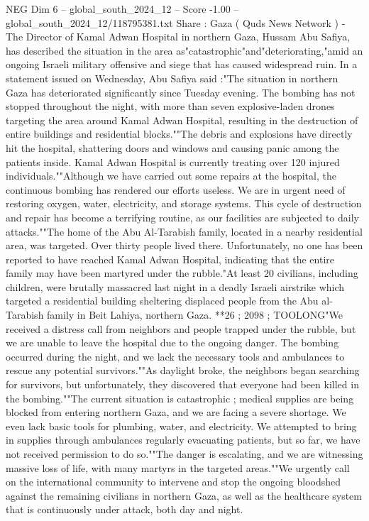 \begin{textsample}{NEG Dim 6 – global\_south\_2024\_12 – Score -1.00 – global\_south\_2024\_12/118795381.txt}  \label{ex:f6_neg_024}
Share : Gaza ( Quds News Network ) - The Director of Kamal Adwan Hospital in northern Gaza, Hussam Abu Safiya, has described the situation in the area as"catastrophic"and"deteriorating,"amid an ongoing Israeli military offensive and siege that has caused widespread ruin.
In a statement issued on Wednesday, Abu Safiya said :"The situation in northern Gaza has deteriorated significantly since Tuesday evening.
The bombing has not stopped throughout the night, with more than seven explosive-laden drones targeting the area around Kamal Adwan Hospital, resulting in the destruction of entire buildings and residential blocks.""The debris and explosions have directly hit the hospital, shattering doors and windows and causing panic among the patients inside.
Kamal Adwan Hospital is currently treating over 120 injured individuals.""Although we have carried out some repairs at the hospital, the continuous bombing has rendered our efforts useless.
We are in urgent need of restoring oxygen, water, electricity, and storage systems.
This cycle of destruction and repair has become a terrifying routine, as our facilities are subjected to daily attacks.""The home of the Abu Al-Tarabish family, located in a nearby residential area, was targeted.
Over thirty people lived there.
Unfortunately, no one has been reported to have reached Kamal Adwan Hospital, indicating that the entire family may have been martyred under the rubble."At least 20 civilians, including children, were brutally massacred last night in a deadly Israeli airstrike which targeted a residential building sheltering displaced people from the Abu al-Tarabish family in Beit Lahiya, northern Gaza. **26 ; 2098 ; TOOLONG"We received a distress call from neighbors and people trapped under the rubble, but we are unable to leave the hospital due to the ongoing danger.
The bombing occurred during the night, and we lack the necessary tools and ambulances to rescue any potential survivors.""As daylight broke, the neighbors began searching for survivors, but unfortunately, they discovered that everyone had been killed in the bombing.""The current situation is catastrophic ; medical supplies are being blocked from entering northern Gaza, and we are facing a severe shortage.
We even lack basic tools for plumbing, water, and electricity.
We attempted to bring in supplies through ambulances regularly evacuating patients, but so far, we have not received permission to do so.""The danger is escalating, and we are witnessing massive loss of life, with many martyrs in the targeted areas.""We urgently call on the international community to intervene and stop the ongoing bloodshed against the remaining civilians in northern Gaza, as well as the healthcare system that is continuously under attack, both day and night.

\end{textsample}
